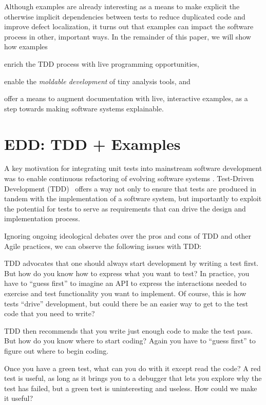 \documentclass[sigplan,anonymous,review,10pt]{acmart}
\begin{document}
Although examples are already interesting as a means to make explicit the otherwise implicit dependencies between tests to reduce duplicated code and improve defect localization, it turns out that examples can impact the software process in other, important ways.
In the remainder of this paper, we will show how examples
\begin{inparaenum}[(i)]
	\item enrich the TDD process with live programming opportunities,
	\item enable the \emph{moldable development} of tiny analysis tools, and
	\item offer a means to augment documentation with live, interactive examples, as a step towards making software systems explainable.
\end{inparaenum}

\section{EDD: TDD + Examples}\label{sec:edd}

A key motivation for integrating unit tests into mainstream software development was to enable continuous refactoring of evolving software systems \cite{Beck00a}.
Test-Driven Development (TDD)~\cite{Beck03a} offers a way not only to ensure that tests are produced in tandem with the implementation of a software system, but importantly to exploit the potential for tests to serve as requirements that can drive the design and implementation process.

Ignoring ongoing ideological debates over the pros and cons of TDD and other Agile practices, we can observe the following issues with TDD:
\begin{inparaenum}[(i)]
	\item TDD advocates that one should always start development by writing a test first.
But how do you know how to express what you want to test?
In practice, you have to ``guess first'' to imagine an API to express the interactions needed to exercise and test functionality you want to implement.
Of course, this is how tests ``drive'' development, but could there be an easier way to get to the test code that you need to write?
	\item TDD then recommends that you write just enough code to make the test pass.
But how do you know where to start coding?
Again you have to ``guess first'' to figure out where to begin coding.
	\item Once you have a green test, what can you do with it except read the code?
A red test is useful, as long as it brings you to a debugger that lets you explore why the test has failed, but a green test is uninteresting and useless.
How could we make it useful?
\end{inparaenum}
\end{document}
